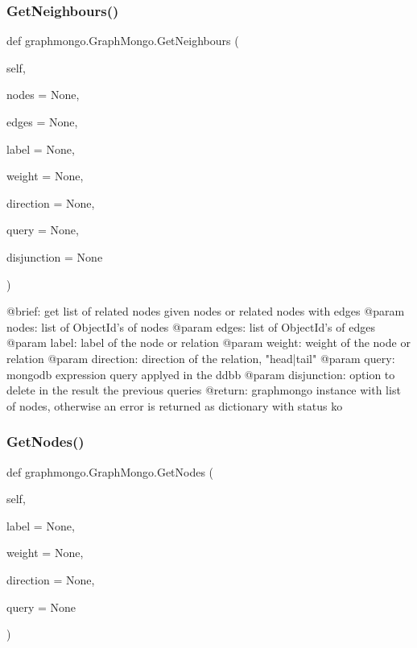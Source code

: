\subsubsection{\texorpdfstring{Get\+Neighbours()}{GetNeighbours()}}
{\footnotesize\ttfamily def graphmongo.\+Graph\+Mongo.\+Get\+Neighbours (\begin{DoxyParamCaption}\item[{}]{self,  }\item[{}]{nodes = {\ttfamily None},  }\item[{}]{edges = {\ttfamily None},  }\item[{}]{label = {\ttfamily None},  }\item[{}]{weight = {\ttfamily None},  }\item[{}]{direction = {\ttfamily None},  }\item[{}]{query = {\ttfamily None},  }\item[{}]{disjunction = {\ttfamily None} }\end{DoxyParamCaption})}

\begin{DoxyVerb}@brief: get list of related nodes given nodes or related nodes with edges
@param nodes: list of ObjectId's of nodes
@param edges: list of ObjectId's of edges
@param label: label of the node or relation
@param weight: weight of the node or relation
@param direction: direction of the relation, "head|tail"
@param query: mongodb expression query applyed in the ddbb
        @param disjunction: option to delete in the result the previous queries
@return: graphmongo instance with list of nodes, otherwise an error is returned as dictionary with status ko
\end{DoxyVerb}
 \hypertarget{classgraphmongo_1_1GraphMongo_a08cfc20b885f77e0e22f9a9a7482dac6}{}\label{classgraphmongo_1_1GraphMongo_a08cfc20b885f77e0e22f9a9a7482dac6} 
\subsubsection{\texorpdfstring{Get\+Nodes()}{GetNodes()}}
{\footnotesize\ttfamily def graphmongo.\+Graph\+Mongo.\+Get\+Nodes (\begin{DoxyParamCaption}\item[{}]{self,  }\item[{}]{label = {\ttfamily None},  }\item[{}]{weight = {\ttfamily None},  }\item[{}]{direction = {\ttfamily None},  }\item[{}]{query = {\ttfamily None} }\end{DoxyParamCaption})}

